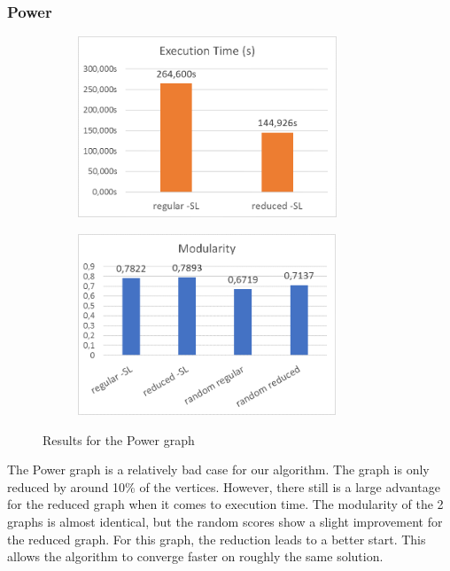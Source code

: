 \subsubsection{Power}
\begin{figure}[H]
\begin{center}
    \begin{subfigure}{0.47\textwidth}
    \begin{center}
    \includegraphics[height=5.4cm]{images/powertime.png}
    \end{center}
    \end{subfigure}
    \begin{subfigure}{0.47\textwidth}
    \begin{center}
    \includegraphics[height=5.4cm]{images/powerfitness.png}
    \end{center}
    \end{subfigure}
\caption{Results for the Power graph}\label{fig:power}
\end{center}
\end{figure}
The Power graph is a relatively bad case for our algorithm. The graph is only reduced by around 10\% of the vertices. However, there still is a large advantage for the reduced graph when it comes to execution time. The modularity of the 2 graphs is almost identical, but the random scores show a slight improvement for the reduced graph. For this graph, the reduction leads to a better start. This allows the algorithm to converge faster on roughly the same solution.

